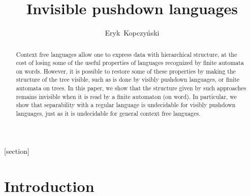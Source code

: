 \documentclass{article}
\title{Invisible pushdown languages}
\author{Eryk~Kopczy\'nski}
\begin{document}
\maketitle

[section]
\renewcommand{\themycount}{\thesection.\arabic{mycount}}

\newtheorem{theorem}[mycount]{Theorem}
\newtheorem{lemma}[mycount]{Lemma}
\newtheorem{definition}[mycount]{Definition}
\newtheorem{problem}[mycount]{Problem}


\newenvironment{proof}[1][]{\medskip{\bf Proof #1 }}{}
\def\qed{\hfill\par\medskip}

\def\mod{{\rm{\ mod\ }}}
\def\ra{\rightarrow}
\def\la{\leftarrow}
\def\trans{\delta}
\def\rh{|}
\def\ut{\tau}
\def\emt{\emptyset}
\def\Port{{\rm{port}}}
\def\Aut{\mathcal A}
\def\Lang{\mathcal L}
\def\restrict{{\rm{Restrict}}}

\def\dom{{\rm{dom}}}
\def\bia{\{0,1\}}
\def\i{\hskip 2em}
\def\EOT{{\rm EOT}}
\def\pat{p}

\def\calC{{\mathcal C}}
\def\bbN{{\mathbb N}}
\def\PaV{V^P}
\def\PaE{E^P}
\def\SpV{{V^\tau}}
\def\SpE{{E^\tau}}
\def\SpR{{v^\tau}}

\def\bbN{{\mathbb N}}
\def\bbR{{\mathbb R}}
\def\bbP{{\mathbb P}}
\def\bbZ{{\mathbb Z}}
\def\bbC{{\mathbb C}}
\def\oa{\diamondsuit}
\def\ca{\overbar{\diamondsuit}}
\def\leaf{\spadesuit}

\newcommand{\overbar}[1]{\mkern 1.5mu\overline{\mkern-1.5mu#1\mkern-1.5mu}\mkern 1.5mu}

\begin{abstract}
Context free languages allow one to express data with hierarchical structure,
at the cost of losing some of the useful properties of languages recognized by 
finite automata on words. However, it is possible
to restore some of these properties by making the structure of the tree visible, 
such as is done by visibly pushdown languages, or finite automata on trees.
In this paper, we show that the structure given by such approaches remains
invisible when it is read by a finite automaton (on word).
In particular, we show
that separability with a regular language
is undecidable for visibly pushdown languages, just as it is undecidable for
general context free languages.
\end{abstract}

\section{Introduction}
\end{document}
